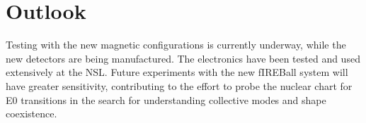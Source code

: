 \section{Outlook}

Testing with the new magnetic configurations is currently underway, while the new detectors are being manufactured. The electronics have been tested and used extensively at the NSL. Future experiments with the new fIREBall system will have greater sensitivity, contributing to the effort to probe the nuclear chart for E0 transitions in the search for understanding collective modes and shape coexistence.


